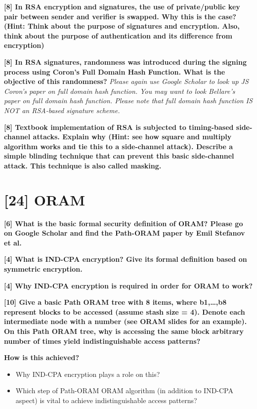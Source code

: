 \documentclass[letterpaper,11pt,notitlepage,fleqn]{article}
\begin{document}
\noindent \textbf{[8]  In  RSA  encryption  and  signatures,  the  use  of  private/public  key  pair  between sender  and  verifier  is  swapped.  Why  this  is  the  case?  (Hint:  Think  about  the purpose  of  signatures  and  encryption.  Also,  think  about  the  purpose  of authentication and its difference from encryption)}

\noindent \textbf{[8]  In  RSA  signatures,  randomness  was  introduced  during  the  signing  process using  Coron’s  Full  Domain  Hash  Function.  What  is  the  objective  of  this randomness?} \textit{Please again use Google Scholar to look up JS Coron’s paper on full domain hash  function. You may want  to  look Bellare’s paper on  full domain hash function.  Please  note  that  full  domain  hash  function  IS  NOT  an  RSA-based signature scheme.}

\noindent \textbf{[8]  Textbook  implementation  of  RSA    is  subjected  to  timing-based  side-channel attacks. Explain why  (Hint:  see how  square  and multiply  algorithm works  and  tie this  to  a  side-channel  attack).  Describe  a  simple  blinding  technique  that  can prevent this basic side-channel attack. This technique is also called masking.}
 
 
\section{[24] ORAM}
 
 
 
\noindent \textbf{[6] What is the basic formal security definition of ORAM? Please go on Google Scholar and find the Path-ORAM paper by Emil Stefanov et al.} 
 
 
 
\noindent \textbf{[4] What is IND-CPA encryption? Give its formal definition based on symmetric encryption.}
 
 
 
\noindent \textbf{[4] Why IND-CPA encryption is required in order for ORAM to work?}
 
 
\noindent \textbf{[10] Give a basic Path ORAM tree with 8 items, where b1,…,b8 represent blocks to be accessed (assume stash size = 4). Denote each intermediate node with a number (see ORAM slides for an example). On this Path ORAM tree, why is accessing the same block arbitrary number of times yield indistinguishable access patterns?} 

\noindent \textbf{How is this achieved?}
\begin{itemize}
    \item Why IND-CPA encryption plays a role on this?
    \item Which  step  of  Path-ORAM  ORAM  algorithm  (in  addition  to  IND-CPA aspect) is vital to achieve indistinguishable access patterns?
\end{itemize}

\medskip


\end{document}
